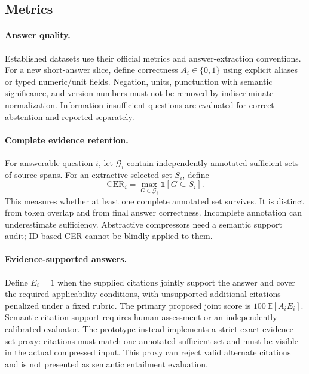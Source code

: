 \documentclass[10pt,twocolumn]{article}
\begin{document}
\subsection{Metrics}
\paragraph{Answer quality.}
Established datasets use their official metrics and answer-extraction conventions. For a new short-answer slice, define correctness $A_i\in\{0,1\}$ using explicit aliases or typed numeric/unit fields. Negation, units, punctuation with semantic significance, and version numbers must not be removed by indiscriminate normalization. Information-insufficient questions are evaluated for correct abstention and reported separately.

\paragraph{Complete evidence retention.}
For answerable question $i$, let $\mathcal G_i$ contain independently annotated sufficient sets of source spans. For an extractive selected set $S_i$, define
\begin{equation}
 \mathrm{CER}_i=\max_{G\in\mathcal G_i}\mathbf{1}[G\subseteq S_i].
\end{equation}
This measures whether at least one complete annotated set survives. It is distinct from token overlap and from final answer correctness. Incomplete annotation can underestimate sufficiency. Abstractive compressors need a semantic support audit; ID-based CER cannot be blindly applied to them.

\paragraph{Evidence-supported answers.}
Define $E_i=1$ when the supplied citations jointly support the answer and cover the required applicability conditions, with unsupported additional citations penalized under a fixed rubric. The primary proposed joint score is $100\,\mathbb{E}[A_iE_i]$. Semantic citation support requires human assessment or an independently calibrated evaluator. The prototype instead implements a strict exact-evidence-set proxy: citations must match one annotated sufficient set and must be visible in the actual compressed input. This proxy can reject valid alternate citations and is not presented as semantic entailment evaluation.
\end{document}

